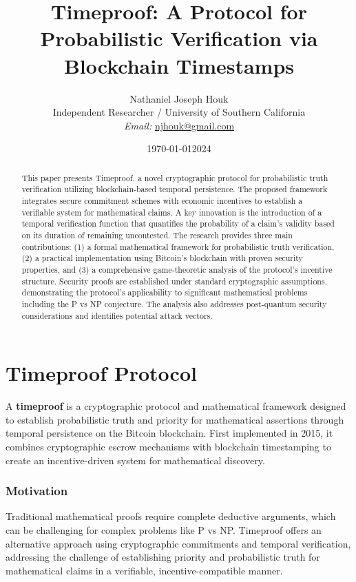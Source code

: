 \documentclass[12pt]{report}
\date{\today}
\begin{document}
\title{Timeproof: A Protocol for Probabilistic Verification via Blockchain Timestamps}
\author{Nathaniel Joseph Houk\\
Independent Researcher / University of Southern California\\
\textit{Email:} \href{mailto:njhouk@gmail.com}{njhouk@gmail.com}}
\date{2024}

\maketitle

\begin{abstract}
This paper presents Timeproof, a novel cryptographic protocol for probabilistic truth verification utilizing blockchain-based temporal persistence. The proposed framework integrates secure commitment schemes with economic incentives to establish a verifiable system for mathematical claims. A key innovation is the introduction of a temporal verification function that quantifies the probability of a claim's validity based on its duration of remaining uncontested. The research provides three main contributions: (1) a formal mathematical framework for probabilistic truth verification, (2) a practical implementation using Bitcoin's blockchain with proven security properties, and (3) a comprehensive game-theoretic analysis of the protocol's incentive structure. Security proofs are established under standard cryptographic assumptions, demonstrating the protocol's applicability to significant mathematical problems including the P vs NP conjecture. The analysis also addresses post-quantum security considerations and identifies potential attack vectors.
\end{abstract}

\chapter{Timeproof Protocol}

A \textbf{timeproof} is a cryptographic protocol and mathematical framework designed to establish probabilistic truth and priority for mathematical assertions through temporal persistence on the Bitcoin blockchain. First implemented in 2015, it combines cryptographic escrow mechanisms with blockchain timestamping to create an incentive-driven system for mathematical discovery.

\subsection{Motivation}
Traditional mathematical proofs require complete deductive arguments, which can be challenging for complex problems like P vs NP. Timeproof offers an alternative approach using cryptographic commitments and temporal verification, addressing the challenge of establishing priority and probabilistic truth for mathematical claims in a verifiable, incentive-compatible manner.
\end{document}
